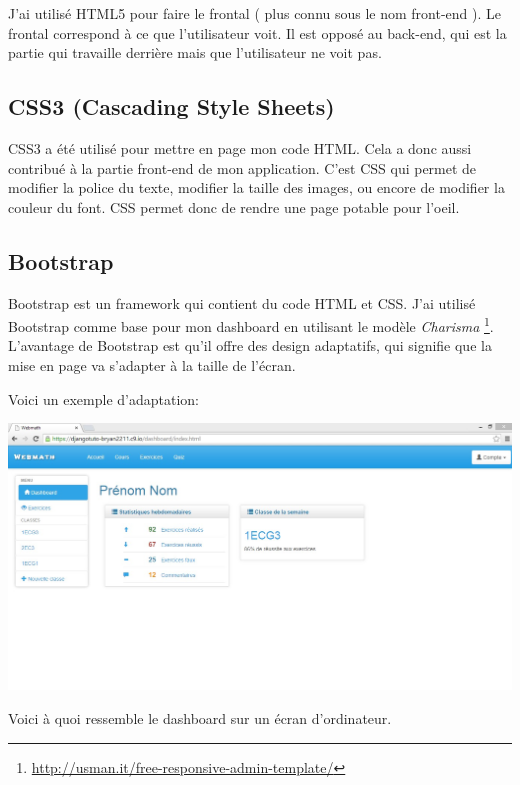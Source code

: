 \documentclass[letterpaper,10pt,french]{sphinxmanual}
\begin{document}
J'ai utilisé HTML5 pour faire le frontal ( plus connu sous le nom front-end ).
Le frontal correspond à ce que l'utilisateur voit. Il est opposé au back-end,
qui est la partie qui travaille derrière mais que l'utilisateur ne voit pas.


\subsection{CSS3 (Cascading Style Sheets)}
\label{documentation:css3-cascading-style-sheets}
CSS3 a été utilisé pour mettre en page mon code HTML. Cela a donc aussi
contribué à la partie front-end de mon application. C'est CSS qui permet de
modifier la police du texte, modifier la taille des images, ou encore
de modifier la couleur du font. CSS permet donc de rendre une page potable
pour l'oeil.


\subsection{Bootstrap}
\label{documentation:bootstrap}
Bootstrap est un framework qui contient du code HTML et CSS. J'ai utilisé
Bootstrap comme base pour mon dashboard en utilisant le modèle \emph{Charisma}
\footnote{
\href{http://usman.it/free-responsive-admin-template/}{http://usman.it/free-responsive-admin-template/}
}. L'avantage de Bootstrap est qu'il offre des
design adaptatifs, qui signifie que la mise en page va s'adapter à la taille de
l'écran.

Voici un exemple d'adaptation:

\includegraphics{fullscreen.png}

Voici à quoi ressemble le dashboard sur un écran d'ordinateur.
\end{document}
